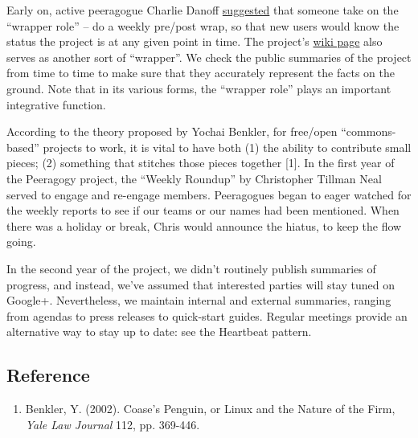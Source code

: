 Early on, active peeragogue Charlie Danoff
\href{http://socialmediaclassroom.com/host/peeragogy/wiki/rolesdivision-labor}{suggested}
that someone take on the ``wrapper role'' -- do a weekly pre/post wrap,
so that new users would know the status the project is at any given
point in time. The project's
\href{http://socialmediaclassroom.com/host/peeragogy/}{wiki page} also
serves as another sort of ``wrapper''.  We check the public summaries
of the project from time to time to make sure that they accurately
represent the facts on the ground. Note that in its various forms, the
``wrapper role'' plays an important integrative function.

According to the theory proposed by Yochai Benkler, for free/open
``commons-based'' projects to work, it is vital to have both (1) the
ability to contribute small pieces; (2) something that stitches those
pieces together {[}1{]}. In the first year of the Peeragogy project,
the ``Weekly Roundup'' by Christopher Tillman Neal served to engage
and re-engage members. Peeragogues began to eager watched for the
weekly reports to see if our teams or our names had been
mentioned. When there was a holiday or break, Chris would announce the
hiatus, to keep the flow going.

In the second year of the project, we didn't routinely publish
summaries of progress, and instead, we've assumed that interested
parties will stay tuned on Google+.  Nevertheless, we maintain
internal and external summaries, ranging from agendas to press
releases to quick-start guides.  Regular meetings provide an
alternative way to stay up to date: see the Heartbeat pattern.

\subsection{Reference}

\begin{enumerate}
\item
  Benkler, Y. (2002). Coase's Penguin, or Linux and the Nature of the
  Firm, \emph{Yale Law Journal} 112, pp. 369-446.
\end{enumerate}
